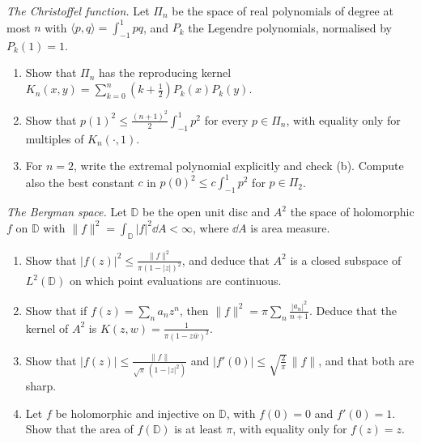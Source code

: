 \begin{exercise}[$\star$]\label{pb:christoffel}
\emph{The Christoffel function.} Let $\Pi_n$ be the space of real polynomials of degree at most $n$ with $\langle p,q\rangle=\int_{-1}^1pq$, and $P_k$ the
Legendre polynomials, normalised by $P_k(1)=1$.
\begin{enumerate}[label=(\alph*)]
\item Show that $\Pi_n$ has the reproducing kernel $K_n(x,y)=\sum_{k=0}^n(k+\frac12)P_k(x)P_k(y)$.
\item Show that $p(1)^2\le\frac{(n+1)^2}2\int_{-1}^1p^2$ for every $p\in\Pi_n$, with equality only for multiples of $K_n(\cdot,1)$.
\item For $n=2$, write the extremal polynomial explicitly and check (b). Compute also the best constant $c$ in $p(0)^2\le c\int_{-1}^1p^2$ for $p\in\Pi_2$.
\end{enumerate}
\end{exercise}

\begin{exercise}[$\star\star$]\label{pb:bergman}
\emph{The Bergman space.} Let $\mathbb D$ be the open unit disc and $A^2$ the space of holomorphic $f$ on $\mathbb D$ with $\|f\|^2=\int_{\mathbb D}|f|^2\dd A<\infty$,
where $\dd A$ is area measure.
\begin{enumerate}[label=(\alph*)]
\item Show that $|f(z)|^2\le\frac{\|f\|^2}{\pi(1-|z|)^2}$, and deduce that $A^2$ is a closed subspace of $L^2(\mathbb D)$ on which point evaluations are continuous.
\item Show that if $f(z)=\sum_na_nz^n$, then $\|f\|^2=\pi\sum_n\frac{|a_n|^2}{n+1}$. Deduce that the kernel of $A^2$ is $K(z,w)=\frac1{\pi(1-z\bar w)^2}$.
\item Show that $|f(z)|\le\frac{\|f\|}{\sqrt\pi\,(1-|z|^2)}$ and $|f'(0)|\le\sqrt{\frac2\pi}\,\|f\|$, and that both are sharp.
\item Let $f$ be holomorphic and injective on $\mathbb D$, with $f(0)=0$ and $f'(0)=1$. Show that the area of $f(\mathbb D)$ is at least $\pi$, with equality
only for $f(z)=z$.
\end{enumerate}
\end{exercise}

